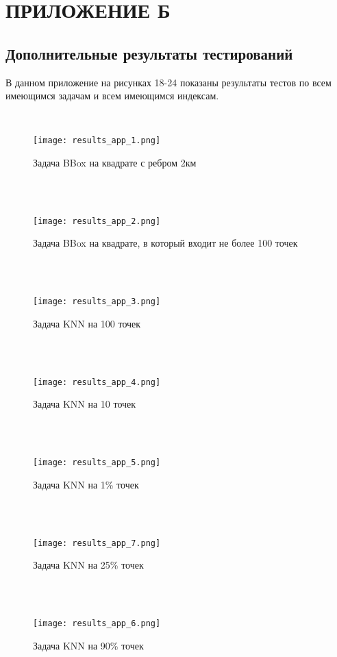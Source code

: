 \chapter{ПРИЛОЖЕНИЕ Б}
\section{Дополнительные результаты тестирований}
В данном приложение на рисунках 18-24 показаны результаты тестов по всем имеющимся задачам и всем имеющимся индексам. 

  \\
\begin{figure}[h]
    \centering
    \texttt{[image: results\_app\_1.png]}
    \caption{Задача BBox на квадрате с ребром 2км}
\end{figure}
  \\
    \\
\begin{figure}[h]
    \centering
    \texttt{[image: results\_app\_2.png]}
    \caption{Задача BBox на квадрате, в который входит не более 100 точек}
\end{figure}
  \\
    \\
\begin{figure}[h]
    \centering
    \texttt{[image: results\_app\_3.png]}
    \caption{Задача KNN на 100 точек}
\end{figure}
  \\
    \\
\begin{figure}[h]
    \centering
    \texttt{[image: results\_app\_4.png]}
    \caption{Задача KNN на 10 точек}
\end{figure}
  \\
    \\
\begin{figure}[h]
    \centering
    \texttt{[image: results\_app\_5.png]}
    \caption{Задача KNN на 1\% точек}
\end{figure}
  \\
    \\
\begin{figure}[h]
    \centering
    \texttt{[image: results\_app\_7.png]}
    \caption{Задача KNN на 25\% точек}
\end{figure}
  \\
    \\
\begin{figure}[h]
    \centering
    \texttt{[image: results\_app\_6.png]}
    \caption{Задача KNN на 90\% точек}
\end{figure}
  \\

